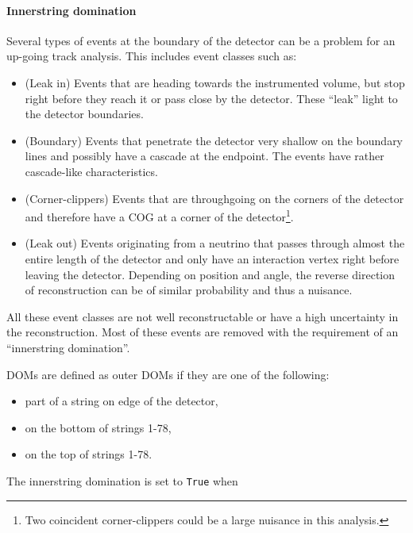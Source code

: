 \paragraph{Innerstring domination}
Several types of events at the boundary of the detector can be a problem for an up-going track analysis. This includes event classes such as:

\vspace{2mm}
\begin{itemize}
\item (Leak in) Events that are heading towards the instrumented volume, but stop right before they reach it or pass close by the detector. These ``leak'' light to the detector boundaries.
\item (Boundary) Events that penetrate the detector very shallow on the boundary lines and possibly have a cascade at the endpoint. The events have rather cascade-like characteristics.
\item (Corner-clippers) Events that are throughgoing on the corners of the detector and therefore have a COG at a corner of the detector\footnote{Two coincident corner-clippers could be a large nuisance in this analysis.}.
\item (Leak out) Events originating from a neutrino that passes through almost the entire length of the detector and only have an interaction vertex right before leaving the detector. Depending on position and angle, the reverse direction of reconstruction can be of similar probability and thus a nuisance.
\end{itemize}
\vspace{2mm}

\noindent All these event classes are not well reconstructable or have a high uncertainty in the reconstruction. Most of these events are removed with the requirement of an ``innerstring domination''.

DOMs are defined as outer DOMs if they are one of the following:

\vspace{2mm}
\begin{itemize}
\item part of a string on edge of the detector,
\item on the bottom of strings 1-78,
\item on the top of strings 1-78.
\end{itemize}
\vspace{2mm}

\noindent The innerstring domination is set to \texttt{True} when 

